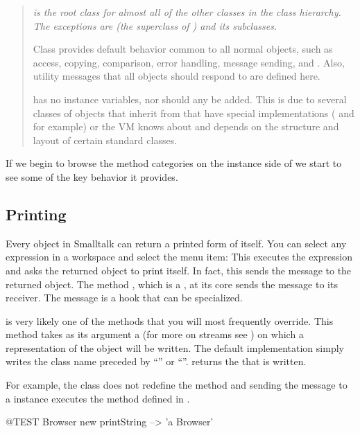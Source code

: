 \documentclass[a4paper,10pt,twoside]{book}
\begin{document}
\begin{quote}\itshape
     is the root class for almost all of the other classes in the class hierarchy.
    The exceptions are  (the superclass of ) and its subclasses.
    
    Class  provides default behavior common to all normal objects, such as access, copying, comparison, error handling, message sending, and .
    Also, utility messages that all objects should respond to are defined here.
    
     has no instance variables, nor should any be added.
    This is due to several classes of objects that inherit from  that have special implementations ( and  for example) or the VM knows about and depends on the structure and layout of certain standard classes.
\end{quote}

If we begin to browse the method categories on the instance side of  we start to see some of the key behavior it provides.

\subsection{Printing}
Every object in Smalltalk can return a printed form of itself.
You can select any expression in a workspace and select the  menu item:
This executes the expression and asks the returned object to print itself.
In fact, this sends the message  to the returned object.
The method , which is a , at its core sends the message  to its receiver.
The message  is a hook that can be specialized. 

 is very likely one of the methods that you will most frequently override.
This method takes as its argument a  (for more on streams see ) on which a  representation of the object will be written.
The default implementation simply writes the class name preceded by ``'' or ``''.
 returns the  that is written.

For example, the class  does not redefine the method  and sending the message  to a  instance executes the method defined in . 
\begin{code}{@TEST}
Browser new printString --> 'a Browser'
\end{code}
\end{document}

